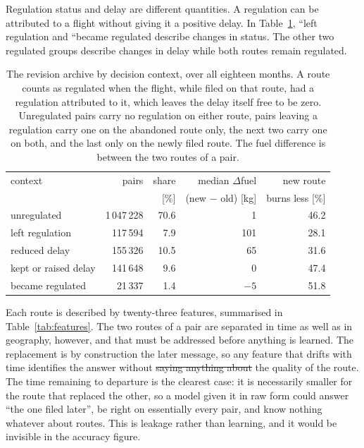\documentclass[conference,10pt,a4paper,IEEEoverridecommandlockouts]{IEEEtran}
\makeatletter
\providecommand{\DIFaddtex}[1]{{\protect\color{blue}\uwave{#1}}} %
\providecommand{\DIFdeltex}[1]{{\protect\color{red}\sout{#1}}} %
\providecommand{\DIFaddbegin}{} %
\providecommand{\DIFaddend}{} %
\providecommand{\DIFdelbegin}{} %
\providecommand{\DIFdelend}{} %
\providecommand{\DIFadd}[1]{\texorpdfstring{\DIFaddtex{#1}}{#1}} %
\providecommand{\DIFdel}[1]{\texorpdfstring{\DIFdeltex{#1}}{}} %
\providecommand{\DIFscaledelfig}{0.5}
\newlength{\DIFdelgraphicswidth} %
\newlength{\DIFdelgraphicsheight} %
\providecommand{\DIFaddincludegraphics}[2][]{{\color{blue}\fbox{\DIFOincludegraphics[#1]{#2}}}} %
\providecommand{\DIFdelincludegraphics}[2][]{%
\sbox{\DIFdelgraphicsbox}{\DIFOincludegraphics[#1]{#2}}%
\settoboxwidth{\DIFdelgraphicswidth}{\DIFdelgraphicsbox} %
\settoboxtotalheight{\DIFdelgraphicsheight}{\DIFdelgraphicsbox} %
\scalebox{\DIFscaledelfig}{%
\parbox[b]{\DIFdelgraphicswidth}{\usebox{\DIFdelgraphicsbox}\\[-\baselineskip] \rule{\DIFdelgraphicswidth}{0em}}\llap{\resizebox{\DIFdelgraphicswidth}{\DIFdelgraphicsheight}{%
\setlength{\unitlength}{\DIFdelgraphicswidth}%
\begin{picture}(1,1)%
\thicklines\linethickness{2pt} %
{\color[rgb]{1,0,0}\put(0,0){\framebox(1,1){}}}%
{\color[rgb]{1,0,0}\put(0,0){\line( 1,1){1}}}%
{\color[rgb]{1,0,0}\put(0,1){\line(1,-1){1}}}%
\end{picture}%
}\hspace*{3pt}}} %
} %
\DeclareRobustCommand{\DIFaddbegin}{\DIFOaddbegin \let\includegraphics\DIFaddincludegraphics} %
\DeclareRobustCommand{\DIFaddend}{\DIFOaddend \let\includegraphics\DIFOincludegraphics} %
\DeclareRobustCommand{\DIFdelbegin}{\DIFOdelbegin \let\includegraphics\DIFdelincludegraphics} %
\DeclareRobustCommand{\DIFdelend}{\DIFOaddend \let\includegraphics\DIFOincludegraphics} %
\let\sout@orig\sout %
\renewcommand{\sout}[1]{\ifmmode\text{\sout@orig{\ensuremath{#1}}}\else\sout@orig{#1}\fi} %
\makeatother
\begin{document}
Regulation status and delay are different quantities. A regulation can
be attributed to a flight without giving it a positive delay. In
Table~\ref{tab:composition}, ``left regulation and ``became regulated
describe changes in status. The other two regulated groups describe
changes in delay while both routes remain regulated.

\begin{table}[t]
\caption{The revision archive by decision context, over all eighteen months.
A route counts as regulated when the flight, while filed on that route,
had a regulation attributed to it, which leaves the delay itself free to
be zero. Unregulated pairs carry no
regulation on either route, pairs leaving a regulation carry one on the abandoned route only,
the next two carry one on both, and the last only on the newly filed route.
The fuel difference is between the two routes of a pair.}
\label{tab:composition}
\centering\footnotesize
\setlength{\tabcolsep}{3pt}
\begin{tabular}{lrrrr}
\toprule
context & pairs & share & median $\Delta$fuel & new route \\
        &       & [\%]  & (new $-$ old) [kg]  & burns less [\%] \\
\midrule
unregulated          & 1\,047\,228 & 70.6 & 1    & 46.2 \\
left regulation      & 117\,594    & 7.9  & 101  & 28.1 \\
reduced delay        & 155\,326    & 10.5 & 65   & 31.6 \\
kept or raised delay & 141\,648    & 9.6  & 0    & 47.4 \\
became regulated     & 21\,337     & 1.4  & $-5$ & 51.8 \\
\bottomrule
\end{tabular}
\end{table}

Each route is described by twenty-three features, summarised in
Table~\ref{tab:features}. The two routes of a pair are separated in time as
well as in geography, however, and that must be addressed before
anything is learned. The replacement is by
construction the later message, so any feature that drifts with time
identifies the answer without \DIFdelbegin \DIFdel{saying anything about }\DIFdelend \DIFaddbegin \DIFadd{needing to assess }\DIFaddend the quality of the
route. The time remaining to departure is the clearest case: it is
necessarily smaller for the route that replaced the other, so a model given
it in raw form could answer ``the one filed later'', be right on essentially
every pair, and know nothing whatever about routes. This is leakage rather
than learning, and it would be invisible in the accuracy figure.
\end{document}

